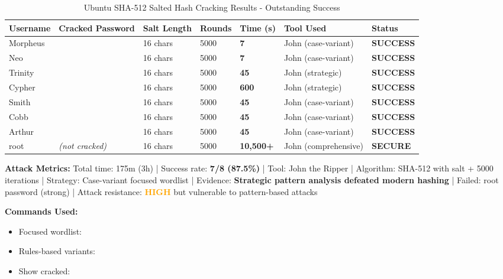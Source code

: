 \begin{table}[H]
\centering
\label{tab:linux-passwords}
\caption{Ubuntu SHA-512 Salted Hash Cracking Results - Outstanding Success}
\begin{tabularx}{\columnwidth}{@{}L{2.0cm}L{2.8cm}L{2.0cm}R{1.2cm}R{1.8cm}R{1.8cm}R{1.8cm}@{}}
\toprule
\textbf{Username} & \textbf{Cracked Password} & \textbf{Salt Length} & \textbf{Rounds} & \textbf{Time (s)} & \textbf{Tool Used} & \textbf{Status} \\
\midrule
{}
Morpheus & \textbf{} & 16 chars & 5000 & \textbf{7} & John (case-variant) & \textbf{SUCCESS} \\
Neo & \textbf{} & 16 chars & 5000 & \textbf{7} & John (case-variant) & \textbf{SUCCESS} \\
Trinity & \textbf{} & 16 chars & 5000 & \textbf{45} & John (strategic) & \textbf{SUCCESS} \\
Cypher & \textbf{} & 16 chars & 5000 & \textbf{600} & John (strategic) & \textbf{SUCCESS} \\
Smith & \textbf{} & 16 chars & 5000 & \textbf{45} & John (case-variant) & \textbf{SUCCESS} \\
Cobb & \textbf{} & 16 chars & 5000 & \textbf{45} & John (case-variant) & \textbf{SUCCESS} \\
Arthur & \textbf{} & 16 chars & 5000 & \textbf{45} & John (case-variant) & \textbf{SUCCESS} \\
root & \textit{(not cracked)} & 16 chars & 5000 & \textbf{10,500+} & John (comprehensive) & \textbf{SECURE} \\
\bottomrule
\end{tabularx}
\end{table}

\noindent\textbf{Attack Metrics:} Total time: 175m (3h) | Success rate: \textbf{7/8 (87.5\%)} | Tool: John the Ripper | Algorithm: SHA-512 with salt + 5000 iterations | Strategy: Case-variant focused wordlist | Evidence: \textbf{Strategic pattern analysis defeated modern hashing} | Failed: root password (strong) | Attack resistance: \textcolor{orange}{\textbf{HIGH}} but vulnerable to pattern-based attacks

\noindent\textbf{Commands Used:}
\begin{itemize}[nosep]
  \item Focused wordlist: 
  \item Rules-based variants: 
  \item Show cracked: 
\end{itemize}

